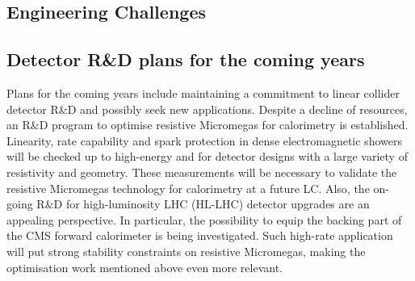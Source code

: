 \subsection{Engineering Challenges}


\subsection{Detector R\&D plans for the coming years}

Plans for the coming years include maintaining a commitment to linear collider detector R\&D and possibly seek new applications. Despite a decline of resources, an R\&D program to optimise resistive Micromegas for calorimetry is established. Linearity, rate capability and spark protection in dense electromagnetic showers will be checked up to high-energy and for detector designs with a large variety of resistivity and geometry. These measurements will be necessary to validate the resistive Micromegas technology for calorimetry at a future LC. Also, the on-going R\&D for high-luminosity LHC (HL-LHC) detector upgrades are an appealing perspective. In particular, the possibility to equip the backing part of the CMS forward calorimeter is being investigated. Such high-rate application will put strong stability constraints on resistive Micromegas, making the optimisation work mentioned above even more relevant.



